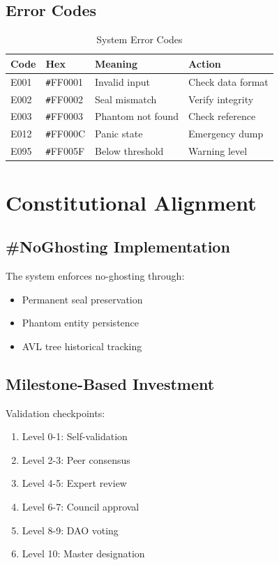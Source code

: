 \documentclass[12pt,a4paper]{report}
\theoremstyle{definition}
\newcommand{\hex}[1]{\texttt{\#}#1}
\begin{document}
\section{Error Codes}

\begin{table}[h]
\centering
\caption{System Error Codes}
\begin{tabular}{|l|l|l|l|}
\hline
\textbf{Code} & \textbf{Hex} & \textbf{Meaning} & \textbf{Action} \\
\hline
E001 & \hex{FF0001} & Invalid input & Check data format \\
E002 & \hex{FF0002} & Seal mismatch & Verify integrity \\
E003 & \hex{FF0003} & Phantom not found & Check reference \\
E012 & \hex{FF000C} & Panic state & Emergency dump \\
E095 & \hex{FF005F} & Below threshold & Warning level \\
\hline
\end{tabular}
\end{table}

\chapter{Constitutional Alignment}

\section{\#NoGhosting Implementation}

The system enforces no-ghosting through:
\begin{itemize}
    \item Permanent seal preservation
    \item Phantom entity persistence
    \item AVL tree historical tracking
\end{itemize}

\section{Milestone-Based Investment}

Validation checkpoints:
\begin{enumerate}
    \item Level 0-1: Self-validation
    \item Level 2-3: Peer consensus
    \item Level 4-5: Expert review
    \item Level 6-7: Council approval
    \item Level 8-9: DAO voting
    \item Level 10: Master designation
\end{enumerate}
\end{document}
